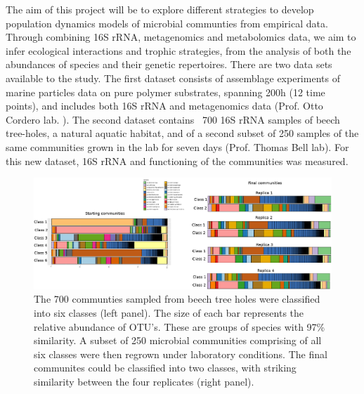 \documentclass[11pt, onehalfspacing]{article}
\begin{document}





The aim of this project will be to explore different strategies to develop population dynamics models of microbial communties from empirical data. Through combining 16S rRNA, metagenomics and metabolomics data, we aim to infer ecological interactions and trophic strategies, from the analysis of both the abundances of species and their genetic repertoires. There are two data sets available to the study. The first dataset consists of assemblage experiments of marine particles data on pure polymer substrates, spanning 200h (12 time points), and includes both 16S rRNA and metagenomics data (Prof. Otto Cordero lab. \citep{datta2016microbial}). The second dataset contains ~700 16S rRNA samples of beech tree-holes, a natural aquatic habitat, and of a second subset of 250 samples of the same communities grown in the lab for seven days (Prof. Thomas Bell lab). For this new dataset, 16S rRNA and functioning of the communities was measured. 

\begin{figure}[H]
	\includegraphics[width=\linewidth]{figure1.png}
	\caption{The 700 communties sampled from beech tree holes were classified into six classes (left panel). The size of each bar represents the relative abundance of OTU's. These are groups of species with 97\% similarity. A subset of 250 microbial communities comprising of all six classes were then regrown under laboratory conditions. The final communites could be classified into two classes, with striking similarity between the four replicates (right panel).}
	\label{fig1}
\end{figure}
\end{document}
